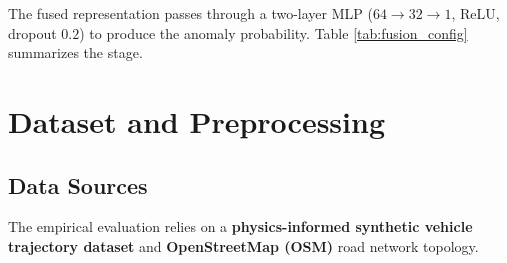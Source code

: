 \documentclass[journal]{IEEEtran}
\begin{document}
The fused representation passes through a two-layer MLP ($64 \rightarrow 32 \rightarrow 1$, ReLU, dropout $0.2$) to produce the anomaly probability. Table \ref{tab:fusion_config} summarizes the stage.

\begin{table}[!htbp]
  \centering
  \caption{Summary of the fusion stage and the four operators compared}
  \label{tab:fusion_config}
  \renewcommand{\arraystretch}{1.15}
\end{table}

\section{Dataset and Preprocessing}

\subsection{Data Sources}
The empirical evaluation relies on a \textbf{physics-informed synthetic vehicle trajectory dataset} and \textbf{OpenStreetMap (OSM)} road network topology.
\end{document}
